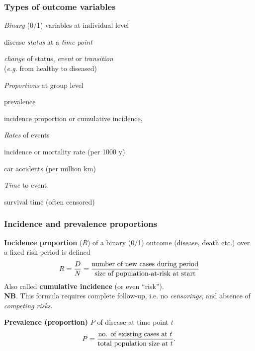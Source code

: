 \documentclass[handout,12pt]{beamer}
\begin{document}
\begin{frame}[fragile] \frametitle{Types of outcome variables}
\bi
\item {\it Binary} (0/1) variables at individual level
  \bi
     \item disease {\it status} at a {\it time point} 
     \item {\it change} of status, {\it event} or {\it transition}\\
     ({\it e.g.} from healthy to diseased) 
  \ei  
\item {\it Proportions} at group level
  \bi
   \item prevalence 
    \item incidence proportion or cumulative incidence,
  \ei
\item {\it Rates} of events
  \bi 
     \item incidence or mortality rate (per 1000 y)
     \item car accidents (per million km)
  \ei
\item {\it Time} to event
  \bi 
     \item survival time (often censored)
  \ei
\ei
\end{frame} 


\begin{frame}[fragile]
 \frametitle{Incidence and prevalence proportions}
\bi
\item {\bf Incidence proportion} ($R$) of a binary (0/1) outcome (disease,
death etc.) over a fixed risk period is defined 
$$
 R = {D\over N} 
  = \frac{ \mbox{number of new cases during period} }
         { \mbox{size of population-at-risk at start} }  
$$
Also called {\bf cumulative incidence} (or even ``risk'').\\
 \medskip
{\bf NB}. This formula requires complete follow-up, i.e.
no {\it censorings}, and absence of {\it competing risks}.
\bigskip
\item {\bf Prevalence (proportion)} $P$ of disease
at time point $t$ 
$$ P 
    = {\mbox{no. of existing cases at } t \over 
   \mbox{total population size at } t } . 
$$
\ei
\end{frame} 
\end{document}
